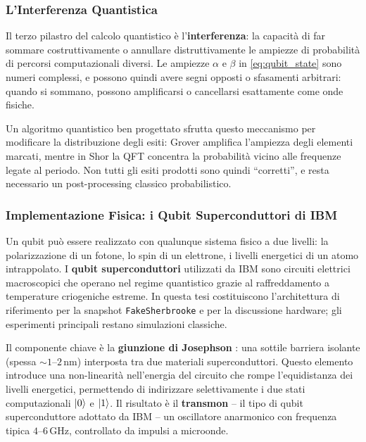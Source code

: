\begin{onehalfspace}
\subsubsection{L'Interferenza Quantistica}

Il terzo pilastro del calcolo quantistico è l'\textbf{interferenza}: la capacità di far sommare costruttivamente o annullare distruttivamente le ampiezze di probabilità di percorsi computazionali diversi. Le ampiezze $\alpha$ e $\beta$ in \eqref{eq:qubit_state} sono numeri complessi, e possono quindi avere segni opposti o sfasamenti arbitrari: quando si sommano, possono amplificarsi o cancellarsi esattamente come onde fisiche.

Un algoritmo quantistico ben progettato sfrutta questo meccanismo per modificare la distribuzione degli esiti: Grover amplifica l'ampiezza degli elementi marcati, mentre in Shor la QFT concentra la probabilità vicino alle frequenze legate al periodo. Non tutti gli esiti prodotti sono quindi ``corretti'', e resta necessario un post-processing classico probabilistico.

\subsubsection{Implementazione Fisica: i Qubit Superconduttori di IBM}

Un qubit può essere realizzato con qualunque sistema fisico a due livelli: la polarizzazione di un fotone, lo spin di un elettrone, i livelli energetici di un atomo intrappolato. I \textbf{qubit superconduttori} utilizzati da IBM sono circuiti elettrici macroscopici che operano nel regime quantistico grazie al raffreddamento a temperature criogeniche estreme. In questa tesi costituiscono l'architettura di riferimento per la snapshot \texttt{FakeSherbrooke} e per la discussione hardware; gli esperimenti principali restano simulazioni classiche.

Il componente chiave è la \textbf{giunzione di Josephson} \cite{josephson1962}: una sottile barriera isolante (spessa $\sim 1$--$2\,$nm) interposta tra due materiali superconduttori. Questo elemento introduce una non-linearità nell'energia del circuito che rompe l'equidistanza dei livelli energetici, permettendo di indirizzare selettivamente i due stati computazionali $\ket{0}$ e $\ket{1}$. Il risultato è il \textbf{transmon} \cite{koch2007} -- il tipo di qubit superconduttore adottato da IBM -- un oscillatore anarmonico con frequenza tipica $4$--$6\,$GHz, controllato da impulsi a microonde.


\end{onehalfspace}
